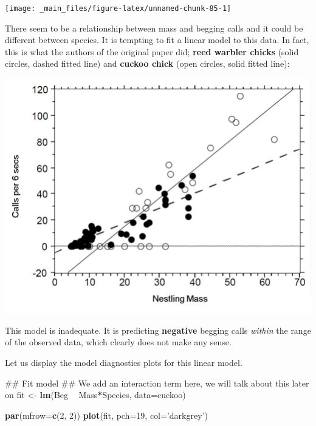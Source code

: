 \documentclass[]{book}
\newenvironment{Shaded}{\begin{snugshade}}{\end{snugshade}}
\newcommand{\KeywordTok}[1]{\textcolor[rgb]{0.13,0.29,0.53}{\textbf{#1}}}
\newcommand{\DataTypeTok}[1]{\textcolor[rgb]{0.13,0.29,0.53}{#1}}
\newcommand{\DecValTok}[1]{\textcolor[rgb]{0.00,0.00,0.81}{#1}}
\newcommand{\StringTok}[1]{\textcolor[rgb]{0.31,0.60,0.02}{#1}}
\newcommand{\OperatorTok}[1]{\textcolor[rgb]{0.81,0.36,0.00}{\textbf{#1}}}
\newcommand{\NormalTok}[1]{#1}
\theoremstyle{definition}
\theoremstyle{definition}
\theoremstyle{definition}
\theoremstyle{remark}
\begin{document}
\begin{center}\texttt{[image: \_main\_files/figure-latex/unnamed-chunk-85-1]} \end{center}

There seem to be a relationship between mass and begging calls and it
could be different between species. It is tempting to fit a linear model
to this data. In fact, this is what the authors of the original paper
did; \textbf{reed warbler chicks} (solid circles, dashed fitted line)
and \textbf{cuckoo chick} (open circles, solid fitted line):

\begin{center}\includegraphics[width=0.75\linewidth]{_img/03-cuckooanalysis} \end{center}

This model is inadequate. It is predicting \textbf{negative} begging
calls \emph{within} the range of the observed data, which clearly does
not make any sense.

Let us display the model diagnostics plots for this linear model.

\begin{Shaded}
\begin{Highlighting}[]
\NormalTok{## Fit model}
\NormalTok{## We add an interaction term here, we will talk about this later on}
\NormalTok{fit <-}\StringTok{ }\KeywordTok{lm}\NormalTok{(Beg }\OperatorTok{~}\StringTok{ }\NormalTok{Mass}\OperatorTok{*}\NormalTok{Species, }\DataTypeTok{data=}\NormalTok{cuckoo) }
\end{Highlighting}
\end{Shaded}

\begin{Shaded}
\begin{Highlighting}[]
\KeywordTok{par}\NormalTok{(}\DataTypeTok{mfrow=}\KeywordTok{c}\NormalTok{(}\DecValTok{2}\NormalTok{, }\DecValTok{2}\NormalTok{))}
\KeywordTok{plot}\NormalTok{(fit, }\DataTypeTok{pch=}\DecValTok{19}\NormalTok{, }\DataTypeTok{col=}\StringTok{'darkgrey'}\NormalTok{)}
\end{Highlighting}
\end{Shaded}
\end{document}
